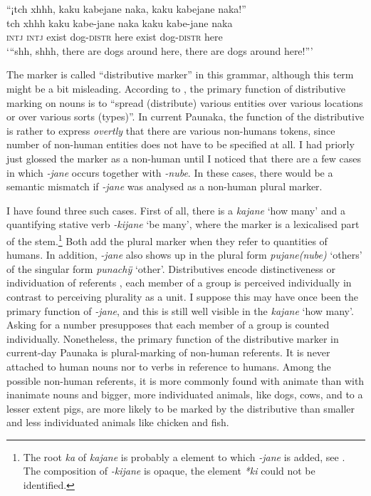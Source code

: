 \ea\label{ex:kabejane}
\begingl 
\glpreamble “¡tch xhhh, kaku kabejane naka, kaku kabejane naka!”\\
\gla tch xhhh kaku kabe-jane naka kaku kabe-jane naka\\ 
\glb \textsc{intj} \textsc{intj} exist dog-\textsc{distr} here exist dog-\textsc{distr} here\\ 
\glft ‘“shh, shhh, there are dogs around here, there are dogs around here!”’\\ 
\endgl
\trailingcitation{[jmx-n120429ls-x5.381]}
\xe

The marker is called “distributive marker” in this grammar, although this term might be a bit misleading. According to \citet[112]{Corbett2000}, the primary function of distributive marking on nouns is to “spread (distribute) various entities over various locations or over various sorts (types)”. In current Paunaka, the function of the distributive is rather to express \textit{overtly} that there are various non-humans tokens, since number of non-human entities does not have to be specified at all. I had priorly just glossed the marker as a non-human  until I noticed that there are a few cases in which \textit{-jane} occurs together with \textit{-nube}. In these cases, there would be a semantic mismatch if \textit{-jane} was analysed as a non-human plural marker.

I have found three such cases. First of all, there is a  \textit{kajane} ‘how many’ and a quantifying stative verb \textit{-kijane} ‘be many’, where the marker is a lexicalised part of the stem.\footnote{The root \textit{ka} of \textit{kajane} is probably a  element to which \textit{-jane} is added, see . The composition of \textit{-kijane} is opaque, the element \textit{*ki} could not be identified.} Both add the plural marker when they refer to quantities of humans. In addition, \textit{-jane} also shows up in the plural form \textit{pujane(nube)} ‘others’ of the singular form \textit{punachÿ} ‘other’. Distributives encode distinctiveness or individuation of referents \citep[116]{Corbett2000}, each member of a group is perceived individually in contrast to perceiving plurality as a unit. I suppose this may have once been the primary function of \textit{-jane}, and this is still well visible in the  \textit{kajane} ‘how many’. Asking for a number presupposes that each member of a group is counted individually. Nonetheless, the primary function of the distributive marker in current-day Paunaka is plural-marking of non-human referents. It is never attached to human nouns nor to verbs in reference to humans. Among the possible non-human referents, it is more commonly found with animate than with inanimate nouns and bigger, more individuated animals, like dogs, cows, and to a lesser extent pigs, are more likely to be marked by the distributive than smaller and less individuated animals like chicken and fish.

